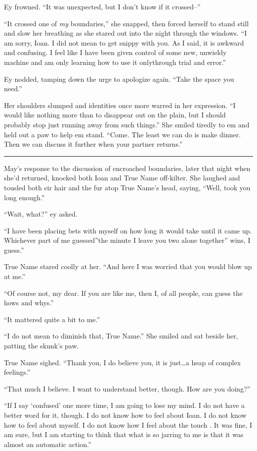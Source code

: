 Ey frowned. ``It was unexpected, but I don't know if it crossed--''

``It crossed one of \emph{my} boundaries,'' she snapped, then forced herself to stand still and slow her breathing as she stared out into the night through the windows. ``I am sorry, Ioan. I did not mean to get snippy with you. As I said, it is awkward and confusing. I feel like I have been given control of some new, unwieldy machine and am only learning how to use it onlythrough trial and error.''

Ey nodded, tamping down the urge to apologize again. ``Take the space you need.''

Her shoulders slumped and identities once more warred in her expression. ``I would like nothing more than to disappear out on the plain, but I should probably stop just running away from such things.'' She smiled tiredly to em and held out a paw to help em stand. ``Come. The least we can do is make dinner. Then we can discuss it further when your partner returns.''

\begin{center}\rule{0.5\linewidth}{0.5pt}\end{center}

May's response to the discussion of encroached boundaries, later that night when she'd returned, knocked both Ioan and True Name off-kilter. She laughed and tousled both eir hair and the fur atop True Name's head, saying, ``Well, took you long enough.''

``Wait, what?'' ey asked.

``I have been placing bets with myself on how long it would take until it came up. Whichever part of me guessed''the minute I leave you two alone together'' wins, I guess.''

True Name stared coolly at her. ``And here I was worried that you would blow up at me.''

``Of course not, my dear. If you are like me, then I, of all people, can guess the hows and whys.''

``It mattered quite a bit to me.''

``I do not mean to diminish that, True Name.'' She smiled and sat beside her, patting the skunk's paw.

True Name sighed. ``Thank you, I do believe you, it is just\ldots a heap of complex feelings.''

``That much I believe. I want to understand better, though. How are you doing?''

``If I say `confused' one more time, I am going to lose my mind. I do not have a better word for it, though. I do not know how to feel about Ioan. I do not know how to feel about myself. I do not know how I feel about the touch . It was fine, I am sure, but I am starting to think that what is so jarring to me is that it was almost an automatic action.''

